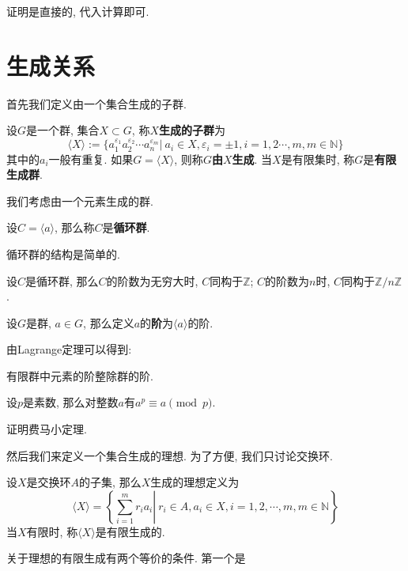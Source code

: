证明是直接的, 代入计算即可.

\section{生成关系}

首先我们定义由一个集合生成的子群.

\begin{defn}
    设$G$是一个群, 集合$X\subset G$, 称{\bfseries $X$生成的子群}为
    \[\langle X\rangle:=\{a_1^{\varepsilon_1}a_2^{\varepsilon_2}\cdots a_n^{\varepsilon_m}|\ a_i\in X,\varepsilon_i=\pm 1,i=1,2\cdots,m,m\in\mathbb{N}\}\]
    其中的$a_i$一般有重复.
    如果$G=\langle X\rangle$, 则称$G${\bf 由$X$生成}.
    当$X$是有限集时, 称$G$是{\bf 有限生成群}.
\end{defn}

我们考虑由一个元素生成的群.
\begin{defn}
    设$C=\langle a\rangle$, 那么称$C$是\textbf{循环群}.
\end{defn}

循环群的结构是简单的.
\begin{prop}
    设$C$是循环群, 那么$C$的阶数为无穷大时, $C$同构于$\mathbb{Z}$; $C$的阶数为$n$时, $C$同构于$\mathbb{Z}/n\mathbb{Z}$.
\end{prop}

\begin{defn}
    设$G$是群, $a\in G$, 那么定义$a$的\textbf{阶}为$\langle a\rangle$的阶.
\end{defn}

由Lagrange定理可以得到:
\begin{col}
    有限群中元素的阶整除群的阶.
\end{col}

\begin{thm}[Fermat小定理]
    设$p$是素数, 那么对整数$a$有$a^p\equiv a\pmod{p}$.
\end{thm}

\begin{ex}
    证明费马小定理.
\end{ex}

然后我们来定义一个集合生成的理想.
为了方便, 我们只讨论交换环.
\begin{defn}
    设$X$是交换环$A$的子集, 那么$X$生成的理想定义为
    \[\langle X\rangle=\left\{\left.\sum_{i=1}^mr_ia_i\right|\ r_i\in A,a_i\in X,i=1,2,\cdots,m,m\in\mathbb{N}\right\}\]
    当$X$有限时, 称$\langle X\rangle$是有限生成的.
\end{defn}

关于理想的有限生成有两个等价的条件.
第一个是

